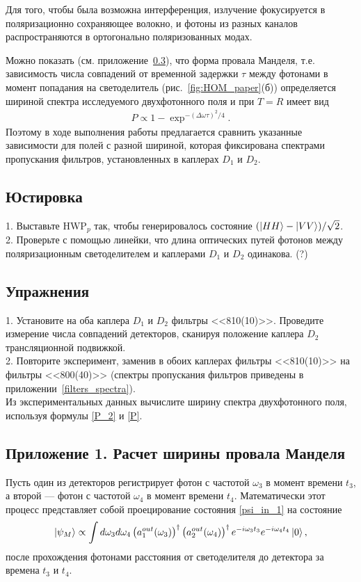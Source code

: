 \documentclass[12pt,a5paper]{article}
\numberwithin{equation}{section}
\begin{document}
Для того, чтобы была возможна интерференция, излучение фокусируется в поляризационно сохраняющее волокно, и фотоны из разных каналов распространяются в ортогонально поляризованных модах.


Можно показать (см. приложение~\ref{bandwidth_calculation}), что форма провала Манделя, т.е. зависимость числа совпадений от временной задержки $\tau$ между фотонами в момент попадания на светоделитель (рис.~\ref{fig:HOM_paper}(б)) определяется шириной спектра исследуемого двухфотонного поля и при $T=R$ имеет вид
\begin{gather}
 P\propto 1-\exp^{-(\Delta\omega \tau)^2/4}.\label{P_2}
\end{gather}
 Поэтому в ходе выполнения работы предлагается сравнить указанные зависимости для полей с разной шириной, которая фиксирована спектрами пропускания фильтров, установленных в каплерах $D_1$ и $D_2$.

\subsection{Юстировка}
1. Выставьте HWP$_p$ так, чтобы генерировалось состояние $(\ket{HH} - \ket{VV})/\sqrt{2}$.\\
2. Проверьте с помощью линейки, что длина оптических путей фотонов между поляризационным светоделителем и каплерами $D_1$ и $D_2$ одинакова. (?)


\subsection{Упражнения}
1. Установите на оба каплера $D_1$ и $D_2$ фильтры <<810(10)>>. Проведите измерение числа совпадений детекторов, сканируя положение каплера $D_2$ трансляционной подвижкой.\\
2. Повторите эксперимент, заменив в обоих каплерах фильтры <<810(10)>> на фильтры <<800(40)>> (спектры пропускания фильтров приведены в приложении~\ref{filters_spectra}).\\
Из экспериментальных данных вычислите ширину спектра двухфотонного поля, используя формулы \ref{P_2}  и  \ref{P}.


\subsection{Приложение 1. Расчет ширины провала Манделя} \label{bandwidth_calculation}

Пусть один из детекторов регистрирует фотон с частотой $\omega_3$ в момент времени $t_3$, а второй --- фотон с частотой $\omega_4$ в момент времени $t_4$.
Математически этот процесс представляет собой проецирование состояния \ref{psi_in_1} на состояние
\begin{gather}
    \ket{\psi_M}\propto \int d\omega_3 d\omega_4 \left(a_1^{out}(\omega_3) \right)^\dagger \left(a_2^{out}(\omega_4)\right)^\dagger
    e^{-i\omega_3 t_3} e^{-i\omega_4 t_4} \ket{0}, \label{psi_M}
 \end{gather}
 после прохождения фотонами расстояния от светоделителя до детектора за времена $t_3$ и $t_4$.
\end{document}
